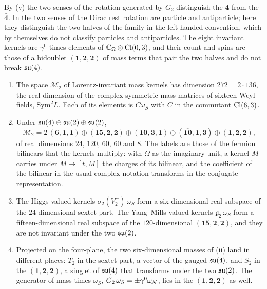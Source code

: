 By (v) the two senses of the rotation generated by $G_2$ distinguish the $\mathbf4$ from the $\bar{\mathbf4}$. In  the two
senses of the Dirac rest rotation are particle and antiparticle; here they distinguish the two halves of the family in the left-handed
convention, which by themselves do not classify particles and antiparticles. The eight invariant kernels are $\gamma^0$ times elements of
$\mathbb{C}_\Omega\otimes\mathrm{Cl}(0,3)$, and their count and spins are those of a bidoublet $(\mathbf1,\mathbf2,\mathbf2)$ of mass terms that pair the two
halves and do not break $\mathfrak{su}(4)$.

\begin{theorem}
\label{thm:massfield2}
\begin{enumerate}[label=(\roman*),leftmargin=2.2em,itemsep=1pt]
\item The space $\mathcal M_2$ of Lorentz-invariant mass kernels has dimension $272=2\cdot136$, the real dimension of the complex symmetric
mass matrices of sixteen Weyl fields, $\mathrm{Sym}^2L$. Each of its elements is $C\omega_S$ with $C$ in the commutant $\mathrm{Cl}(6,3)$.
\item Under $\mathfrak{su}(4)\oplus\mathfrak{su}(2)\oplus\mathfrak{su}(2)$,
\[
\mathcal M_2=2\,(\mathbf6,\mathbf1,\mathbf1)\oplus(\mathbf{15},\mathbf2,\mathbf2)\oplus(\mathbf{10},\mathbf3,\mathbf1)\oplus
(\overline{\mathbf{10}},\mathbf1,\mathbf3)\oplus(\mathbf1,\mathbf2,\mathbf2),
\]
of real dimensions $24$, $120$, $60$, $60$ and $8$. The labels are those of the fermion bilinears that the kernels multiply: with $\Omega$ as
the imaginary unit, a kernel $M$ carries under $M\mapsto[t,M]$ the charges of its bilinear, and the coefficient of the bilinear in the usual
complex notation transforms in the conjugate representation.
\item The Higgs-valued kernels $\sigma_2(V^+_2)\,\omega_S$ form a six-dimensional real subspace of the $24$-dimensional sextet part. The
Yang--Mills-valued kernels $\mathfrak g_2\,\omega_S$ form a fifteen-dimensional real subspace of the $120$-dimensional
$(\mathbf{15},\mathbf2,\mathbf2)$, and they are not invariant under the two $\mathfrak{su}(2)$.
\item Projected on the four-plane, the two six-dimensional masses of (ii) land in different places: $T_2$ in the sextet part, a
vector of the gauged $\mathfrak{su}(4)$, and $S_2$ in the $(\mathbf1,\mathbf2,\mathbf2)$, a singlet of $\mathfrak{su}(4)$ that transforms under the two $\mathfrak{su}(2)$. The
generator of mass times $\omega_S$, $G_2\,\omega_S=\pm\gamma^0\omega_\mathcal N$, lies in the $(\mathbf1,\mathbf2,\mathbf2)$ as well.
\end{enumerate}
\end{theorem}

